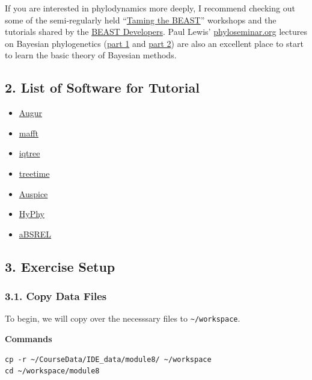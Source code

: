 \documentclass[
]{book}
\providecommand{\tightlist}{%
  \setlength{\itemsep}{0pt}\setlength{\parskip}{0pt}}
\begin{document}
If you are interested in phylodynamics more deeply, I recommend checking out some of the semi-regularly held ``\href{https://taming-the-beast.org/workshops/Taming-the-BEAST-Online/}{Taming the BEAST}'' workshops and the tutorials shared by the \href{http://www.beast2.org/tutorials/}{BEAST Developers}. Paul Lewis' \href{http://phyloseminar.org/recorded.html}{phyloseminar.org} lectures on Bayesian phylogenetics (\href{https://www.youtube.com/watch?v=4PWlnNsfz90}{part 1} and \href{https://www.youtube.com/watch?v=TLtOS--YwkU}{part 2}) are also an excellent place to start to learn the basic theory of Bayesian methods.

\subsection{2. List of Software for Tutorial}\label{list-of-software-for-tutorial}

\begin{itemize}
\tightlist
\item
  \href{https://docs.nextstrain.org/projects/augur/en/stable/index.html}{Augur}
\item
  \href{https://mafft.cbrc.jp/alignment/software/}{mafft}
\item
  \href{http://www.iqtree.org/}{iqtree}
\item
  \href{https://treetime.readthedocs.io/en/latest/}{treetime}
\item
  \href{https://auspice.us/}{Auspice}
\item
  \href{http://hyphy.org/}{HyPhy}
\item
  \href{http://hyphy.org/methods/selection-methods/}{aBSREL}
\end{itemize}

\subsection{3. Exercise Setup}\label{exercise-setup}

\subsubsection{3.1. Copy Data Files}\label{copy-data-files}

To begin, we will copy over the necesssary files to \texttt{\textasciitilde{}/workspace}.

\textbf{Commands}

\begin{verbatim}
cp -r ~/CourseData/IDE_data/module8/ ~/workspace
cd ~/workspace/module8
\end{verbatim}
\end{document}
